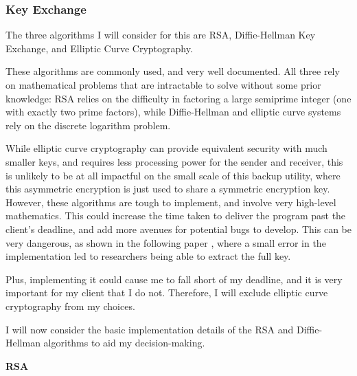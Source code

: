 \documentclass[../main.tex]{subfiles}
\begin{document}
\subsubsection{Key Exchange} \label{KeyExchangeSSS}

The three algorithms I will consider for this are RSA, Diffie-Hellman Key Exchange, and Elliptic Curve Cryptography.

These algorithms are commonly used, and very well documented. All three rely on mathematical problems that are intractable to solve without some prior knowledge: RSA relies on the difficulty in factoring a large semiprime integer (one with exactly two prime factors), while Diffie-Hellman and elliptic curve systems rely on the discrete logarithm problem. 

While elliptic curve cryptography can provide equivalent security with much smaller keys, and requires less processing power for the sender and receiver, this is unlikely to be at all impactful on the small scale of this backup utility, where this asymmetric encryption is just used to share a symmetric encryption key. However, these algorithms are tough to implement, and involve very high-level mathematics. This could increase the time taken to deliver the program past the client’s deadline, and add more avenues for potential bugs to develop. This can be very dangerous, as shown in the following paper \cite{10.1007/978-3-642-27954-6_11}, where a small error in the implementation led to researchers being able to extract the full key. 

Plus, implementing it could cause me to fall short of my deadline, and it is very important for my client that I do not. Therefore, I will exclude elliptic curve cryptography from my choices.

I will now consider the basic implementation details of the RSA and Diffie-Hellman algorithms to aid my decision-making.

\bigskip
\textbf{RSA}
 
\end{document}
